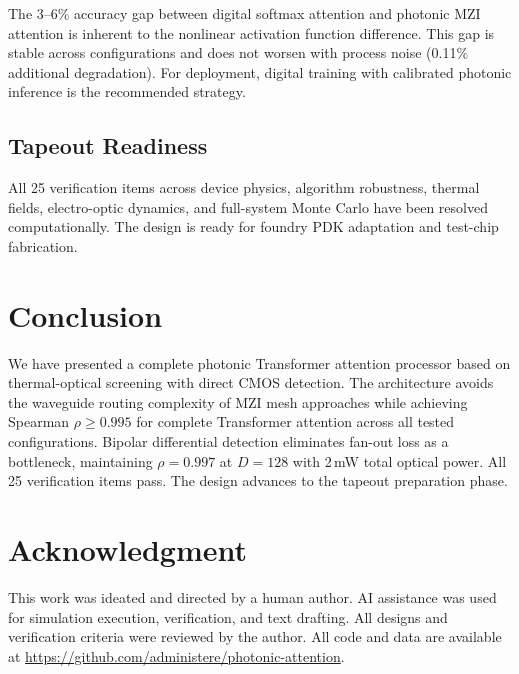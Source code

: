 \documentclass[conference]{IEEEtran}
\begin{document}
The 3--6\% accuracy gap between digital softmax attention and photonic
MZI attention is inherent to the nonlinear activation function
difference. This gap is stable across configurations and does not
worsen with process noise (0.11\% additional degradation). For
deployment, digital training with calibrated photonic inference is
the recommended strategy.

\subsection{Tapeout Readiness}

All 25 verification items across device physics, algorithm robustness,
thermal fields, electro-optic dynamics, and full-system Monte Carlo
have been resolved computationally. The design is ready for foundry
PDK adaptation and test-chip fabrication.

\section{Conclusion}

We have presented a complete photonic Transformer attention processor
based on thermal-optical screening with direct CMOS detection. The
architecture avoids the waveguide routing complexity of MZI mesh
approaches while achieving Spearman $\rho\ge0.995$ for complete
Transformer attention across all tested configurations. Bipolar
differential detection eliminates fan-out loss as a bottleneck,
maintaining $\rho=0.997$ at $D=128$ with 2\,mW total optical power.
All 25 verification items pass. The design advances to the tapeout
preparation phase.

\section*{Acknowledgment}

This work was ideated and directed by a human author. AI assistance
was used for simulation execution, verification, and text drafting.
All designs and verification criteria were reviewed by the author.
All code and data are available at
\url{https://github.com/administere/photonic-attention}.



\end{document}
